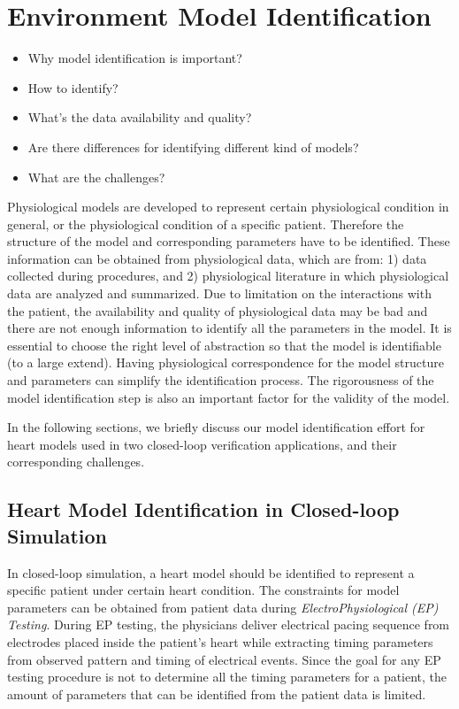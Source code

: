 \chapter{Environment Model Identification}
\begin{itemize}
	\item Why model identification is important?
    \item How to identify?
    \item What's the data availability and quality?
    \item Are there differences for identifying different kind of models?
    \item What are the challenges?
\end{itemize}
Physiological models are developed to represent certain physiological condition in general, or the physiological condition of a specific patient. Therefore the structure of the model and corresponding parameters have to be identified. These information can be obtained from physiological data, which are from: 1) data collected during procedures, and 2) physiological literature in which physiological data are analyzed and summarized. Due to limitation on the interactions with the patient, the availability and quality of physiological data may be bad and there are not enough information to identify all the parameters in the model. It is essential to choose the right level of abstraction so that the model is identifiable (to a large extend). Having physiological correspondence for the model structure and parameters can simplify the identification process. The rigorousness of the model identification step is also an important factor for the validity of the model. 

In the following sections, we briefly discuss our model identification effort for heart models used in two closed-loop verification applications, and their corresponding challenges. 

\section{Heart Model Identification in Closed-loop Simulation}
In closed-loop simulation, a heart model should be identified to represent a specific patient under certain heart condition. The constraints for model parameters can be obtained from patient data during \emph{ElectroPhysiological (EP) Testing}. During EP testing, the physicians deliver electrical pacing sequence from electrodes placed inside the patient's heart while extracting timing parameters from observed pattern and timing of electrical events. Since the goal for any EP testing procedure is not to determine all the timing parameters for a patient, the amount of parameters that can be identified from the patient data is limited.    

